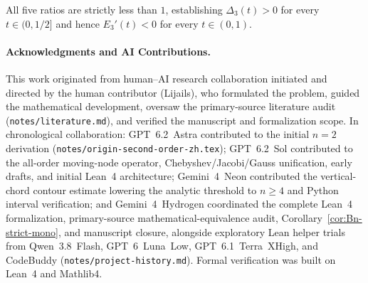 \documentclass[11pt,a4paper]{article}
\newcommand{\code}[1]{\nolinkurl{#1}}
\theoremstyle{remark}
\numberwithin{equation}{section}
\begin{document}
All five ratios are strictly less than $1$, establishing $\Delta_3(t) > 0$ for every $t \in (0, 1/2]$ and hence $E_3'(t) < 0$ for every $t \in (0, 1)$.


\paragraph*{Acknowledgments and AI Contributions.}
This work originated from human--AI research collaboration initiated and directed by the human contributor (Lijails), who formulated the problem, guided the mathematical development, oversaw the primary-source literature audit (\code{notes/literature.md}), and verified the manuscript and formalization scope. In chronological collaboration: GPT~6.2~Astra contributed to the initial $n = 2$ derivation (\code{notes/origin-second-order-zh.tex}); GPT~6.2~Sol contributed to the all-order moving-node operator, Chebyshev/Jacobi/Gauss unification, early drafts, and initial Lean~4 architecture; Gemini~4~Neon contributed the vertical-chord contour estimate lowering the analytic threshold to $n \ge 4$ and Python interval verification; and Gemini~4~Hydrogen coordinated the complete Lean~4 formalization, primary-source mathematical-equivalence audit, Corollary~\ref{cor:Bn-strict-mono}, and manuscript closure, alongside exploratory Lean helper trials from Qwen~3.8~Flash, GPT~6~Luna~Low, GPT~6.1~Terra~XHigh, and CodeBuddy (\code{notes/project-history.md}). Formal verification was built on Lean~4 and Mathlib4.
\end{document}
